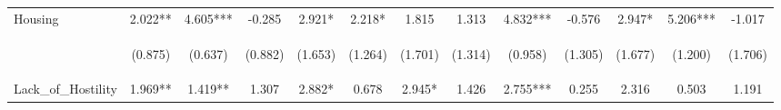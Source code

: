 \begin{tabular}{lcccccccccccc}
\noalign{\smallskip}Housing & 2.022** & 4.605*** & -0.285 & 2.921* & 2.218* & 1.815 & 1.313 & 4.832*** & -0.576 & 2.947* & 5.206*** & -1.017\\
 & \begin{footnotesize}(0.875)\end{footnotesize} & \begin{footnotesize}(0.637)\end{footnotesize} & \begin{footnotesize}(0.882)\end{footnotesize} & \begin{footnotesize}(1.653)\end{footnotesize} & \begin{footnotesize}(1.264)\end{footnotesize} & \begin{footnotesize}(1.701)\end{footnotesize} & \begin{footnotesize}(1.314)\end{footnotesize} & \begin{footnotesize}(0.958)\end{footnotesize} & \begin{footnotesize}(1.305)\end{footnotesize} & \begin{footnotesize}(1.677)\end{footnotesize} & \begin{footnotesize}(1.200)\end{footnotesize} & \begin{footnotesize}(1.706)\end{footnotesize}\\
\noalign{\smallskip}Lack_of_Hostility & 1.969** & 1.419** & 1.307 & 2.882* & 0.678 & 2.945* & 1.426 & 2.755*** & 0.255 & 2.316 & 0.503 & 1.191\\

\end{tabular}

